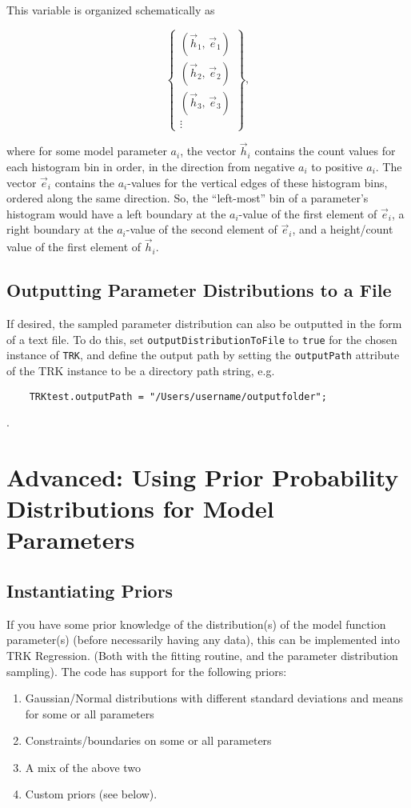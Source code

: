 \documentclass[12pt]{article}
\newcommand{\li}{\lstinline}
\begin{document}
This variable is organized schematically as

\begin{equation}
    \begin{Bmatrix}
        \left(\vec{h}_{1}, \, \vec{e}_{1}\right) \\
        \left(\vec{h}_{2}, \, \vec{e}_{2}\right) \\
        \left(\vec{h}_{3}, \, \vec{e}_{3}\right) \\
        \vdots
    \end{Bmatrix},
\end{equation}

where for some model parameter $a_i$, the vector $\vec{h}_i$ contains the count values for each histogram bin in order, in the direction from negative $a_i$ to positive $a_i$. The vector $\vec{e}_i$ contains the $a_i$-values for the vertical edges of these histogram bins, ordered along the same direction. So, the ``left-most'' bin of a parameter's histogram would have a left boundary at the $a_i$-value of the first element of $\vec{e}_i$, a right boundary at the $a_i$-value of the second element of $\vec{e}_i$, and a height/count value of the first element of $\vec{h}_i$.

\subsection{Outputting Parameter Distributions to a File}
If desired, the sampled parameter distribution can also be outputted in the form of a text file. To do this, set \li{outputDistributionToFile} to \li{true} for the chosen instance of \li{TRK}, and define the output path by setting the \li{outputPath} attribute of the TRK instance to be a directory path string, e.g. 
\begin{lstlisting}
    TRKtest.outputPath = "/Users/username/outputfolder";
\end{lstlisting}
.
\section{Advanced: Using Prior Probability Distributions for Model Parameters}

\subsection{Instantiating Priors}

\par If you have some prior knowledge of the distribution(s) of the model function parameter(s) (before necessarily having any data), this can be implemented into TRK Regression. (Both with the fitting routine, and the parameter distribution sampling). The code has support for the following priors:
\begin{enumerate}
	\item Gaussian/Normal distributions with different standard deviations and means for some or all parameters
	\item Constraints/boundaries on some or all parameters
	\item A mix of the above two
	\item Custom priors (see below).
\end{enumerate} 
\end{document}
